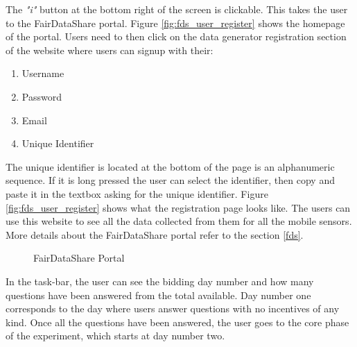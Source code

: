 The {\it "i"} button at the bottom right of the screen is clickable. This takes the user to the FairDataShare portal. Figure \ref{fig:fds_user_register} shows the homepage of the portal. Users need to then click on the data generator registration section of the website where users can signup with their:

\begin{enumerate}
    \item Username
    \item Password
    \item Email
    \item Unique Identifier
\end{enumerate}

The unique identifier is located at the bottom of the page is an alphanumeric sequence. If it is long pressed the user can select the identifier, then copy and paste it in the  textbox asking for the unique identifier. Figure \ref{fig:fds_user_register} shows what the registration page looks like.
The users can use this website to see all the data collected from them for all the mobile sensors. More details about the FairDataShare portal
refer to the section \ref{fds}.

\begin{figure}[htp]
  \hspace{1em}
  \caption{FairDataShare Portal}
  \label{fig:first}
\end{figure}

In the task-bar, the user can see the bidding day number and how many questions have been answered from the total available. Day number one
corresponds to the day where users answer questions with no incentives of any kind.
Once all the questions have been answered, the user goes to the core phase of the experiment, which starts at day number two.

